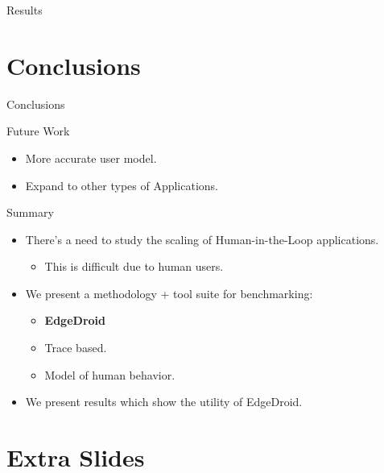 \documentclass[aspectratio=1610]{beamer}
\begin{document}
\begin{frame}{Results}
\begin{center}
{        }%
    \end{center}
\end{frame}

\section{Conclusions}
\begin{frame}{Conclusions}
    \begin{block}{Future Work}
        \begin{itemize}
            \itemsep1em
            \item More accurate user model.
            \item Expand to other types of Applications.
        \end{itemize}
    \end{block}

    \begin{block}{Summary}
        \begin{itemize}
            \itemsep1em
            \item There's a need to study the scaling of Human-in-the-Loop applications.
            \begin{itemize}
                \item This is difficult due to human users.
            \end{itemize}
            \item We present a methodology + tool suite for benchmarking:
            \begin{itemize}
                \item \textbf{EdgeDroid}
                \item Trace based.
                \item Model of human behavior.
            \end{itemize}
            \item We present results which show the utility of EdgeDroid.
        \end{itemize}
    \end{block}
\end{frame}

\startpage
\section{Extra Slides}
\begin{frame}{}
\end{frame}
\end{document}
